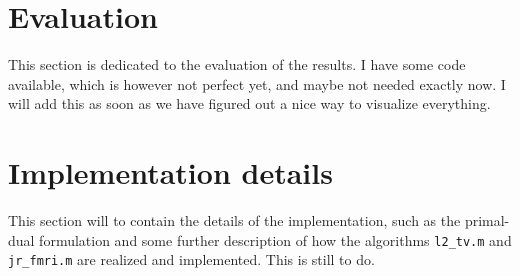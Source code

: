 \documentclass{article}
\newcommand{\mat}[1]{\lstinline[style=Matlab-editor]{#1}}
\begin{document}
\section{Evaluation}
This section is dedicated to the evaluation of the results. 
I have some code available, which is however not perfect yet, and maybe not needed exactly now. 
I will add this as soon as we have figured out a nice way to visualize everything.

\section{Implementation details}
This section will to contain the details of the implementation, such as the primal-dual formulation and some further description of how the algorithms \mat{l2_tv.m} and \mat{jr_fmri.m} are realized and implemented.
This is still to do.
 
\end{document}

